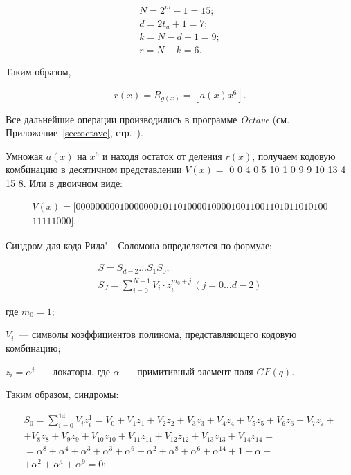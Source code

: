 \begin{gather*}
  N = 2^m - 1 = 15;\\
  d = 2t_u + 1 = 7;\\
  k = N - d + 1 = 9;\\
  r = N - k = 6.
\end{gather*}

Таким образом,

\begin{equation*}
  r(x) = R_{g(x)} = \left[a(x)x^6\right].
\end{equation*}

Все дальнейшие операции производились в программе \textit{Octave}
(см. Приложение~\ref{sec:octave}, стр.~\pageref{page3}).

Умножая $a(x)$ на $x^6$ и находя остаток от деления $r(x)$, получаем
кодовую комбинацию в десятичном представлении
$V(x) =$ 0    0    4    0    5   10    1    0    9    9   10   13    4
15    8. Или в двоичном виде:

\begin{gather*}
  V(x) = [0000000001000000010110100001000010011001101011010100\\
  11111000].
\end{gather*}

Синдром для кода Рида"--~Соломона определяется по формуле:

\begin{gather*}
  S = S_{d-2} \ldots S_1S_0,\\
  S_J = \sum _{i=0} ^{N-1} V_i \cdot z_i^{m_0+j} \, (j = 0
  \ldots d-2)
\end{gather*}

\begin{ESKDexplanation}
\item[где ] $m_0 = 1$;
\item $V_i$~--- символы коэффициентов полинома, представляющего
  кодовую комбинацию;
\item $z_i = \alpha^i$~--- локаторы, где $\alpha$~--- примитивный
  элемент поля $GF(q)$.
\end{ESKDexplanation}

Таким образом, синдромы:

\begin{gather*}
  S_0 = \sum_{i = 0}^{14}V_iz_i^1 = V_0 + V_1z_1 + V_2z_2 + V_3z_3 +
  V_4z_4 + V_5z_5 + V_6z_6 + V_7z_7 + \\ + V_8z_8 + V_9z_9 +
  V_{10}z_{10} + V_{11}z_{11} + V_{12}z_{12} + V_{13}z_{13} +
  V_{14}z_{14} =  \\ = \alpha^8 + \alpha^4 + \alpha^3 + \alpha^3 +
  \alpha^6 + \alpha^2 + \alpha^8 + \alpha^6 + \alpha^{14} + 1 + \alpha
  + \\ + \alpha^2 + \alpha^4 + \alpha^9 = 0;
\end{gather*}

